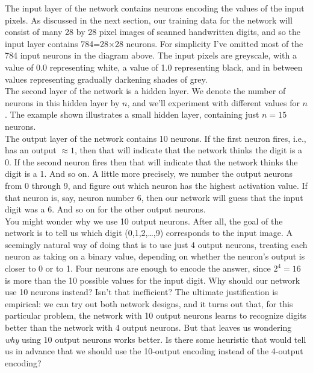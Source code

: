 The input layer of the network contains neurons encoding the values of the input pixels. As discussed in the next section, our training data for the network will consist of many 28 by 28 pixel images of scanned handwritten digits, and so the input layer contains 784=28×28 neurons. For simplicity I've omitted most of the 784 input neurons in the diagram above. The input pixels are greyscale, with a value of 0.0 representing white, a value of 1.0 representing black, and in between values representing gradually darkening shades of grey.\\

The second layer of the network is a hidden layer. We denote the number of neurons in this hidden layer by $n$, and we'll experiment with different values for $n$. The example shown illustrates a small hidden layer, containing just $n=15$ neurons.\\

The output layer of the network contains 10 neurons. If the first neuron fires, i.e., has an output $\approx1$, then that will indicate that the network thinks the digit is a 0. If the second neuron fires then that will indicate that the network thinks the digit is a 1. And so on. A little more precisely, we number the output neurons from 0 through 9, and figure out which neuron has the highest activation value. If that neuron is, say, neuron number 6, then our network will guess that the input digit was a 6. And so on for the other output neurons.\\

You might wonder why we use 10 output neurons. After all, the goal of the network is to tell us which digit (0,1,2,…,9) corresponds to the input image. A seemingly natural way of doing that is to use just 4 output neurons, treating each neuron as taking on a binary value, depending on whether the neuron's output is closer to 0 or to 1. Four neurons are enough to encode the answer, since $2^4=16$ is more than the 10 possible values for the input digit. Why should our network use 10 neurons instead? Isn't that inefficient? The ultimate justification is empirical: we can try out both network designs, and it turns out that, for this particular problem, the network with 10 output neurons learns to recognize digits better than the network with 4 output neurons. But that leaves us wondering \textit{why} using 10 output neurons works better. Is there some heuristic that would tell us in advance that we should use the 10-output encoding instead of the 4-output encoding?\\


